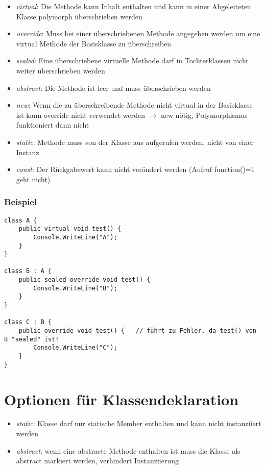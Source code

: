 \begin{itemize}
\item \emph{virtual}: Die Methode kann Inhalt enthalten und kann in einer Abgeleiteten Klasse polymorph überschrieben werden
\item \emph{override}: Muss bei einer überschriebenen Methode angegeben werden um eine virtual Methode der Basisklasse zu überschreiben
\item \emph{sealed}: Eine überschriebene virtuelle Methode darf in Tochterklassen nicht weiter überschrieben werden
\item \emph{abstract}: Die Methode ist leer und muss überschrieben werden
\item \emph{new}: Wenn die zu überschreibende Methode nicht virtual in der Basisklasse ist kann override nicht verwendet werden $\to$ new nötig, Polymorphismus funktioniert dann nicht
\item \emph{static}: Methode muss von der Klasse aus aufgerufen werden, nicht von einer Instanz
\item \emph{const}: Der Rückgabewert kann nicht verändert werden (Aufruf function()=1 geht nicht)
\end{itemize}

\subsubsection*{Beispiel}
\begin{lstlisting}[language={[Sharp]C}]
class A {
	public virtual void test() {
		Console.WriteLine("A");
	}
}

class B : A {
	public sealed override void test() {
		Console.WriteLine("B");
	}
}

class C : B {
	public override void test() {	// führt zu Fehler, da test() von B "sealed" ist!
		Console.WriteLine("C");
	}
}
\end{lstlisting}

\section{Optionen für Klassendeklaration}

\begin{itemize}
\item \emph{static}: Klasse darf nur statische Member enthalten und kann nicht instanziiert werden 
\item \emph{abstract}: wenn eine abstracte Methode enthalten ist muss die Klasse als abstract markiert werden, verhindert Instanziierung
\end{itemize}

